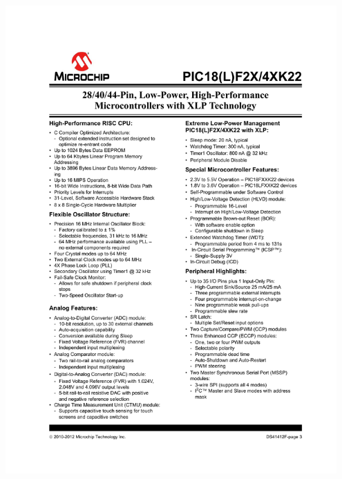 \documentclass[12pt,a4paper]{article}
\begin{document}
\newpage
\includegraphics[width=0.95\textwidth,viewport=73 56 545 772,clip=true]{../figs/pic18f26k22-features-from-datasheet.pdf}
\end{document}
